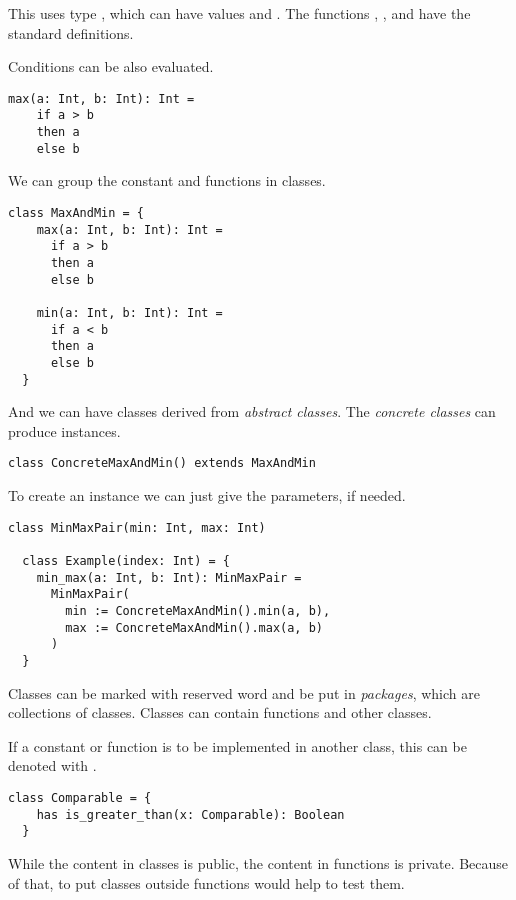 This uses type , which can have values \sfalse and \strue.
The functions \sand, \sor, and \snot have the standard definitions.

Conditions can be also evaluated.
\begin{lstlisting}[label={lst:exampleMax}]
  max(a: Int, b: Int): Int =
    if a > b
    then a
    else b
\end{lstlisting}

We can group the constant and functions in classes.

\begin{lstlisting}[label={lst:exampleClassMax}]
  class MaxAndMin = {
    max(a: Int, b: Int): Int =
      if a > b
      then a
      else b

    min(a: Int, b: Int): Int =
      if a < b
      then a
      else b
  }
\end{lstlisting}

And we can have classes derived from \emph{abstract classes}.
The \emph{concrete classes} can produce instances.

\begin{lstlisting}[label={lst:exampleClassMaxWithIndex}]
  class ConcreteMaxAndMin() extends MaxAndMin
\end{lstlisting}

To create an instance we can just give the parameters, if needed.

\begin{lstlisting}[label={lst:exampleClassMaxAnInstance}]
  class MinMaxPair(min: Int, max: Int)

  class Example(index: Int) = {
    min_max(a: Int, b: Int): MinMaxPair =
      MinMaxPair(
        min := ConcreteMaxAndMin().min(a, b),
        max := ConcreteMaxAndMin().max(a, b)
      )
  }
\end{lstlisting}

Classes can be marked with \spackage reserved word and be put in \emph{packages}, which are collections of classes.
Classes can contain functions and other classes.

If a constant or function is to be implemented in another class, this can be denoted with \shas.

\begin{lstlisting}[label={lst:exampleAbstractFunction}]
  class Comparable = {
    has is_greater_than(x: Comparable): Boolean
  }
\end{lstlisting}

While the content in classes is public, the content in functions is private.
Because of that, to put classes outside functions would help to test them.

